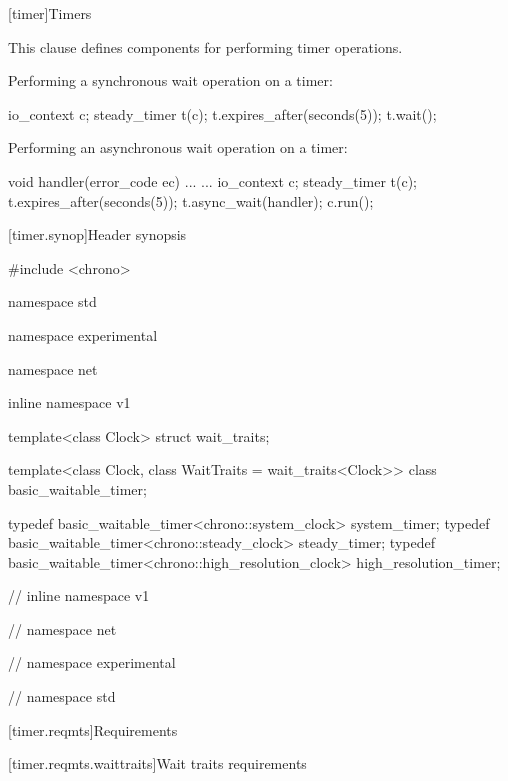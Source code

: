 
[timer]{Timers}

\pnum
This clause defines components for performing timer operations.

\pnum
\begin{example} Performing a synchronous wait operation on a timer: 
\begin{codeblock}
io_context c;
steady_timer t(c);
t.expires_after(seconds(5));
t.wait();
\end{codeblock}
 \end{example}

\pnum
\begin{example} Performing an asynchronous wait operation on a timer: 
\begin{codeblock}
void handler(error_code ec) { ... }
...
io_context c;
steady_timer t(c);
t.expires_after(seconds(5));
t.async_wait(handler);
c.run();
\end{codeblock}
 \end{example}


%
[timer.synop]{Header  synopsis}

\begin{codeblock}
#include <chrono>

namespace std {
namespace experimental {
namespace net {
inline namespace v1 {

  template<class Clock> struct wait_traits;

  template<class Clock, class WaitTraits = wait_traits<Clock>>
    class basic_waitable_timer;

  typedef basic_waitable_timer<chrono::system_clock> system_timer;
  typedef basic_waitable_timer<chrono::steady_clock> steady_timer;
  typedef basic_waitable_timer<chrono::high_resolution_clock> high_resolution_timer;

} // inline namespace v1
} // namespace net
} // namespace experimental
} // namespace std
\end{codeblock}



[timer.reqmts]{Requirements}


[timer.reqmts.waittraits]{Wait traits requirements}

